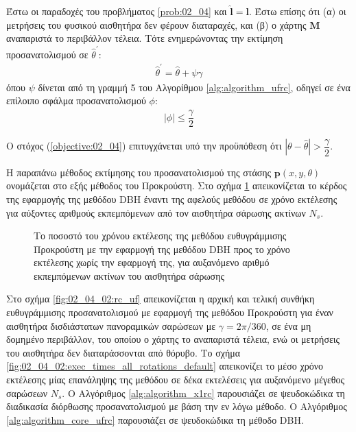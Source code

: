 \begin{lemma}
  Έστω οι παραδοχές του προβλήματος \ref{prob:02_04} και $\hat{\bm{l}} = \bm{l}$.
  Έστω επίσης ότι (α) οι μετρήσεις του φυσικού αισθητήρα δεν φέρουν
  διαταραχές, και (β) ο χάρτης $\bm{M}$ αναπαριστά το περιβάλλον τέλεια. Τότε
  ενημερώνοντας την εκτίμηση προσανατολισμού σε
  $\hat{\theta}^\prime$:
  \begin{align}
    \hat{\theta}^\prime = \hat{\theta} + \psi \gamma \label{eq:update_t3}
  \end{align}
  όπου $\psi$ δίνεται από τη γραμμή 5 του Αλγορίθμου \ref{alg:algorithm_ufrc},
  οδηγεί σε ένα επίλοιπο σφάλμα προσανατολισμού $\phi$:
  \begin{align}
    |\phi| \leq \dfrac{\gamma}{2}  \label{eq:phi_3}
  \end{align}
  \label{lemma:02_04_02:03}
\end{lemma}

\begin{corollary}
  Ο στόχος (\ref{objective:02_04}) επιτυγχάνεται υπό την προϋπόθεση ότι
  $|\theta-\hat{\theta}| > \dfrac{\gamma}{2}$.
\end{corollary}

Η παραπάνω μέθοδος εκτίμησης του προσανατολισμού της στάσης $\bm{p}(x,y,\theta)$
ονομάζεται στο εξής μέθοδος του Προκρούστη. Στο σχήμα
\ref{fig:02_04_02:ku_vs_dbh} απεικονίζεται το κέρδος της εφαρμογής της μεθόδου
DBH έναντι της αφελούς μεθόδου σε χρόνο εκτέλεσης για αύξοντες αριθμούς
εκπεμπόμενων από τον αισθητήρα σάρωσης ακτίνων $N_s$.

\begin{figure}[!h]\centering
  \vspace{1.0cm}
  
  \vspace{0.5cm}
  \caption{\small Το ποσοστό του χρόνου εκτέλεσης της μεθόδου ευθυγράμμισης
           Προκρούστη με την εφαρμογή της μεθόδου DBH προς το χρόνο εκτέλεσης
           χωρίς την εφαρμογή της, για αυξανόμενο αριθμό εκπεμπόμενων ακτίνων
           του αισθητήρα σάρωσης}
  \label{fig:02_04_02:ku_vs_dbh}
\end{figure}

Στο σχήμα \ref{fig:02_04_02:rc_uf} απεικονίζεται η αρχική και τελική συνθήκη
ευθυγράμμισης προσανατολισμού με εφαρμογή της μεθόδου Προκρούστη για έναν
αισθητήρα δισδιάστατων πανοραμικών σαρώσεων με $\gamma = 2\pi/360$, σε ένα μη
δομημένο περιβάλλον, του οποίου ο χάρτης το αναπαριστά τέλεια, ενώ οι μετρήσεις
του αισθητήρα δεν διαταράσσονται από θόρυβο. Το σχήμα
\ref{fig:02_04_02:exec_times_all_rotations_default} απεικονίζει το μέσο χρόνο
εκτέλεσης μίας επανάληψης της μεθόδου σε δέκα εκτελέσεις για αυξανόμενο μέγεθος
σαρώσεων $N_s$. Ο Αλγόριθμος \ref{alg:algorithm_x1rc} παρουσιάζει σε
ψευδοκώδικα τη διαδικασία διόρθωσης προσανατολισμού με βάση την εν λόγω μέθοδο.
Ο Αλγόριθμος \ref{alg:algorithm_core_ufrc} παρουσιάζει σε ψευδοκώδικα τη μέθοδο
DBH.

